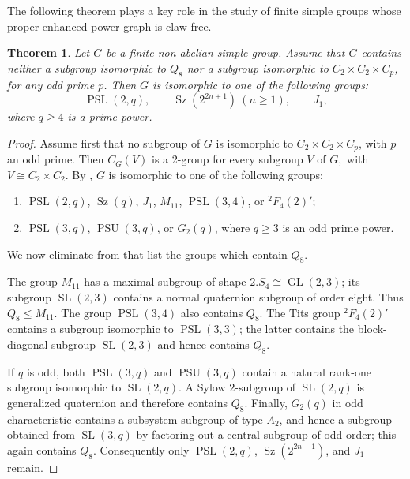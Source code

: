 \documentclass[preprint,11pt]{elsarticle}
\newcommand{\PSL}{\operatorname{PSL}}
\newcommand{\PSU}{\operatorname{PSU}}
\newcommand{\SL}{\operatorname{SL}}
\newcommand{\GL}{\operatorname{GL}}
\newcommand{\Sz}{\operatorname{Sz}}
\newtheorem{theorem}{\bf Theorem}[section]
\begin{document}
The following theorem plays a key role in the study of finite simple groups whose proper enhanced power graph is claw-free.

\begin{theorem}\label{thm:classification}
	Let $G$ be a finite non-abelian simple group.  Assume that $G$ contains neither a subgroup isomorphic to $Q_8$ nor a subgroup
	isomorphic to $C_2\times C_2\times C_p$, for any odd prime $p$.
	Then $G$ is isomorphic to one of the following groups:
	\[
	\PSL(2,q),\qquad
	\Sz(2^{2n+1})\ (n\geq 1),\qquad
	J_1,
	\]
	where $q\geq4$ is a prime power.
\end{theorem}
\begin{proof}
	Assume first that no subgroup of $G$ is isomorphic to $C_2\times C_2\times C_p$, with $p$ an odd prime. Then $C_G(V)$ is a 2-group for every subgroup $V$ of $G,$ with $V\cong C_2\times C_2.$
By	\cite[Theorem 1]{Syskin1978},
$G$ is isomorphic to one of the following groups:
	\begin{enumerate}[(1)]
		\item $\operatorname{PSL}(2,q)$, $\operatorname{Sz}(q)$, $J_{1}$, $M_{11}$, $\operatorname{PSL}(3,4)$, or ${}^{2}F_{4}(2)'$;
		\item $\operatorname{PSL}(3,q)$, $\operatorname{PSU}(3,q)$, or $G_{2}(q)$, where $q \geq 3$ is an odd prime power.
	\end{enumerate}
	 We now eliminate from that list the groups
	which contain $Q_8$.
	
	The group $M_{11}$ has a maximal subgroup of shape
	$2.S_4\cong\GL(2,3)$; its subgroup $\SL(2,3)$ contains a normal quaternion
	subgroup of order eight.  Thus $Q_8\leq M_{11}$.  
	The group $\PSL(3,4)$ also contains $Q_8$.  
	The Tits group ${}^2F_4(2)'$ contains a subgroup isomorphic to
	$\PSL(3,3)$; the latter contains the block-diagonal subgroup
	$\SL(2,3)$ and hence contains $Q_8$.
	
	If $q$ is odd, both $\PSL(3,q)$ and $\PSU(3,q)$ contain a natural rank-one
	subgroup isomorphic to $\SL(2,q)$.  A Sylow $2$-subgroup of $\SL(2,q)$ is
	generalized quaternion and therefore contains $Q_8$.  Finally, $G_2(q)$ in
	odd characteristic contains a subsystem subgroup of type $A_2$, and hence a
	subgroup obtained from $\SL(3,q)$ by factoring out a central subgroup of odd
	order; this again contains $Q_8$.  
	Consequently only $\PSL(2,q)$, $\Sz(2^{2n+1})$, and $J_1$ remain.
\end{proof}
\end{document}
